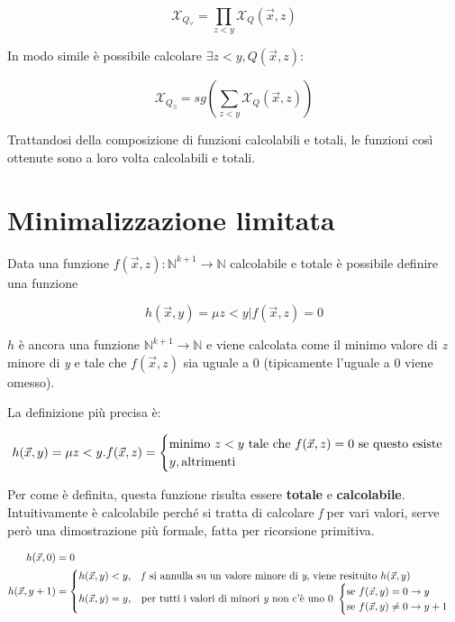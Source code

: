 $$
\mathcal{X}_{Q_\forall} = \prod_{z < y} \mathcal{X}_Q(\vec{x},z)
$$

In modo simile è possibile calcolare $ \exists z < y, Q(\vec{x},z) $:

$$
\mathcal{X}_{Q_\exists} = sg(\sum_{z < y} \mathcal{X}_Q(\vec{x},z))
$$

Trattandosi della composizione di funzioni calcolabili e totali, le funzioni così ottenute sono a loro volta calcolabili e totali.

\section{Minimalizzazione limitata}

Data una funzione $ f(\vec{x},z) : \mathbb{N}^{k+1} \rightarrow \mathbb{N}$ calcolabile e totale è possibile definire una funzione 

$$
h(\vec{x},y) = \mu z< y | f(\vec{x},z) = 0
$$

$ h $ è ancora una funzione $ \mathbb{N}^{k+1} \rightarrow \mathbb{N} $ e viene calcolata come il minimo valore di \textit{z} minore di \textit{y} e tale che $ f(\vec{x},z) $ sia uguale a 0 (tipicamente l'uguale a 0 viene omesso). 

La definizione più precisa è:

$$
h(\vec{x}, y) = \mu z < y . f(\vec{x},z) = \begin{cases}
\text{minimo $ z < y $ tale che $f(\vec{x},z) = 0$ se questo esiste} \\
y, \text{altrimenti}
\end{cases}
$$

Per come è definita, questa funzione risulta essere \textbf{totale} e \textbf{calcolabile}.
Intuitivamente è calcolabile perché si tratta di calcolare \textit{f} per vari valori, serve però una dimostrazione più formale, fatta per ricorsione primitiva.

\begin{align*}
	h(\vec{x}, 0) &= 0\\
	h(\vec{x}, y+1) &= 	\begin{cases}
										h(\vec{x},y) < y, &\text{\textit{f} si annulla su un valore minore di \textit{y}, viene resituito $ h(\vec{x},y) $}\\
										h(\vec{x},y) = y, &\text{per tutti i valori di minori \textit{y} non c'è uno 0 } \begin{cases}
										\text{se } f(\vec{x},y) = 0 \rightarrow y \\ 
										\text{se } f(\vec{x},y) \neq 0 \rightarrow y+1
										\end{cases}
										\end{cases}
\end{align*}

